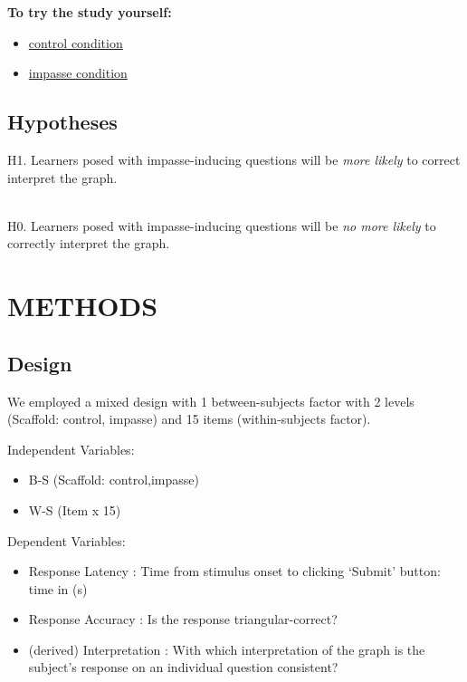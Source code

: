 \documentclass[
  letterpaper,
  DIV=11,
  numbers=noendperiod]{scrreprt}
\providecommand{\tightlist}{%
  \setlength{\itemsep}{0pt}\setlength{\parskip}{0pt}}\usepackage{longtable,booktabs,array}
\begin{document}
\textbf{To try the study yourself:}

\begin{itemize}
\item
  \href{https://limitless-plains-85018.herokuapp.com/?study=SGC3A\&condition=111\&session=WEB-DEMO}{control
  condition}
\item
  \href{https://limitless-plains-85018.herokuapp.com/?study=SGC3A\&condition=121\&session=WEB-DEMO}{impasse
  condition}
\end{itemize}

\hypertarget{hypotheses}{%
\subsection*{Hypotheses}\label{hypotheses}}

H1. Learners posed with impasse-inducing questions will be \emph{more
likely} to correct interpret the graph.\\
\strut \\
H0. Learners posed with impasse-inducing questions will be \emph{no more
likely} to correctly interpret the graph.

\hypertarget{methods}{%
\section*{METHODS}\label{methods}}

\hypertarget{design}{%
\subsection*{Design}\label{design}}

We employed a mixed design with 1 between-subjects factor with 2 levels
(Scaffold: control, impasse) and 15 items (within-subjects factor).

Independent Variables:

\begin{itemize}
\tightlist
\item
  B-S (Scaffold: control,impasse)
\item
  W-S (Item x 15)
\end{itemize}

Dependent Variables:

\begin{itemize}
\tightlist
\item
  Response Latency : Time from stimulus onset to clicking `Submit'
  button: time in (s)
\item
  Response Accuracy : Is the response triangular-correct?
\item
  (derived) Interpretation : With which interpretation of the graph is
  the subject's response on an individual question consistent?
\end{itemize}
\end{document}

